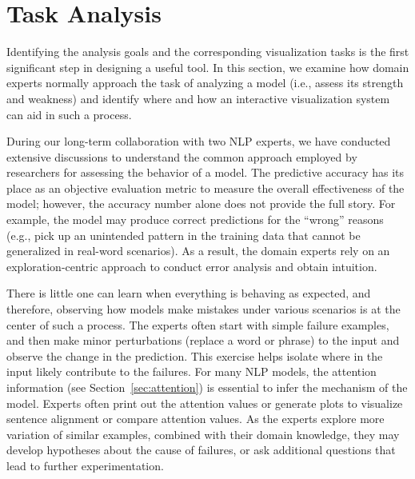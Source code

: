 \section{Task Analysis}
\label{sec:task}
Identifying the analysis goals and the corresponding visualization tasks is the first significant step in designing a useful tool. In this section, we examine how domain experts normally approach the task of analyzing a model (i.e., assess its strength and weakness) and identify where and how an interactive visualization system can aid in such a process.

During our long-term collaboration with two NLP experts, we have conducted extensive discussions to understand the common approach employed by researchers for assessing the behavior of a model.%
The predictive accuracy has its place as an objective evaluation metric to measure the overall effectiveness of the model; however, the accuracy number alone does not provide the full story.
For example, the model may produce correct predictions for the ``wrong'' reasons (e.g., pick up an unintended pattern in the training data that cannot be generalized in real-word scenarios).
%
As a result, the domain experts rely on an exploration-centric approach to conduct error analysis and obtain intuition.

There is little one can learn when everything is behaving as expected, and therefore,
observing how models make mistakes under various scenarios is at the center of such a process.
The experts often start with simple failure examples, and then make minor perturbations (replace a word or phrase) to the input and observe the change in the prediction. This exercise helps isolate where in the input likely contribute to the failures. For many NLP models, the attention information (see Section~\ref{sec:attention}) is essential to infer the mechanism of the model. Experts often print out the attention values or generate plots to visualize sentence alignment or compare attention values. As the experts explore more variation of similar examples, combined with their domain knowledge, they may develop hypotheses about the cause of failures, or ask additional questions that lead to further experimentation.

